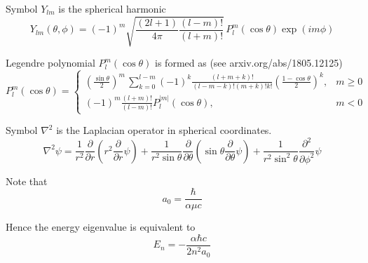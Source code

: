 Symbol $Y_{lm}$ is the spherical harmonic
\begin{equation*}
Y_{lm}(\theta,\phi)=(-1)^m
\sqrt{\frac{(2l+1)}{4\pi}
\frac{(l-m)!}{(l+m)!}}\,
P_l^m(\cos\theta)\exp(im\phi)
\end{equation*}

Legendre polynomial $P_l^m(\cos\theta)$ is formed as (see arxiv.org/abs/1805.12125)
\begin{equation*}
P_l^m(\cos\theta)=\begin{cases}
\displaystyle
\left(\frac{\sin\theta}{2}\right)^m\,\sum_{k=0}^{l-m}
(-1)^k\frac{(l+m+k)!}{(l-m-k)!(m+k)!k!}
\left(\frac{1-\cos\theta}{2}\right)^k, & m\ge0
\\[4ex]
\displaystyle
(-1)^m\frac{(l+m)!}{(l-m)!}P_l^{|m|}(\cos\theta), & m<0
\end{cases}
\end{equation*}

Symbol $\nabla^2$ is the Laplacian operator in spherical coordinates.
\begin{equation*}
\nabla^2\psi=\frac{1}{r^2}\frac{\partial}{\partial r}
\left(r^2\frac{\partial}{\partial r}\psi\right)
+
\frac{1}{r^2\sin\theta}\frac{\partial}{\partial\theta}
\left(\sin\theta\frac{\partial}{\partial\theta}\psi\right)
+
\frac{1}{r^2\sin^2\theta}\frac{\partial^2}{\partial\phi^2}\psi
\end{equation*}

Note that
\begin{equation*}
a_0=\frac{\hbar}{\alpha\mu c}
\end{equation*}

Hence the energy eigenvalue is equivalent to
\begin{equation*}
E_n=-\frac{\alpha\hbar c}{2n^2a_0}
\end{equation*}


